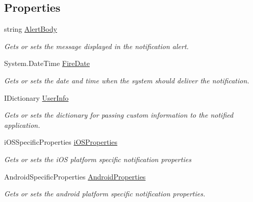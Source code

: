 \subsection*{Properties}
\begin{DoxyCompactItemize}
\item 
string \hyperlink{class_voxel_busters_1_1_native_plugins_1_1_cross_platform_notification_ade308ee127438f612b377e8045a4e120}{Alert\+Body}
\begin{DoxyCompactList}\small\item\em Gets or sets the message displayed in the notification alert. \end{DoxyCompactList}\item 
System.\+Date\+Time \hyperlink{class_voxel_busters_1_1_native_plugins_1_1_cross_platform_notification_a1ec556b2f3aeeebdccfa617f4c9d2471}{Fire\+Date}
\begin{DoxyCompactList}\small\item\em Gets or sets the date and time when the system should deliver the notification. \end{DoxyCompactList}\item 
I\+Dictionary \hyperlink{class_voxel_busters_1_1_native_plugins_1_1_cross_platform_notification_afe57e84d9a5251e7f2146537692c4e11}{User\+Info}
\begin{DoxyCompactList}\small\item\em Gets or sets the dictionary for passing custom information to the notified application. \end{DoxyCompactList}\item 
i\+O\+S\+Specific\+Properties \hyperlink{class_voxel_busters_1_1_native_plugins_1_1_cross_platform_notification_abd422ec8f4bd9c46e8b4ce7ea5d80a9d}{i\+O\+S\+Properties}
\begin{DoxyCompactList}\small\item\em Gets or sets the i\+O\+S platform specific notification properties \end{DoxyCompactList}\item 
Android\+Specific\+Properties \hyperlink{class_voxel_busters_1_1_native_plugins_1_1_cross_platform_notification_a98a9f3e1981f5d4d3cff4067a9e0ce9a}{Android\+Properties}
\begin{DoxyCompactList}\small\item\em Gets or sets the android platform specific notification properties. \end{DoxyCompactList}\end{DoxyCompactItemize}


